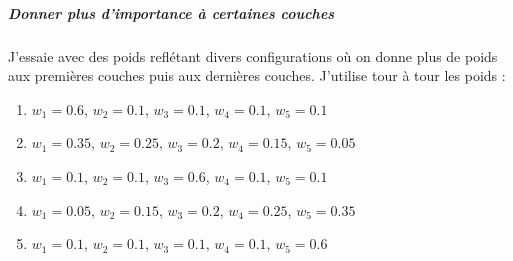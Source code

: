 \documentclass{article}
\begin{document}
\subparagraph*{Donner plus d'importance à certaines couches}
J'essaie avec des poids reflétant divers configurations où on donne plus de poids aux premières couches puis aux dernières couches.
J'utilise tour à tour les poids :
\begin{enumerate}
\item $w_1 = 0.6$, $w_2 = 0.1$, $w_3 = 0.1$, $w_4 = 0.1$, $w_5 = 0.1$
\item $w_1 = 0.35$, $w_2 = 0.25$, $w_3 = 0.2$, $w_4 = 0.15$, $w_5 = 0.05$
\item $w_1 = 0.1$, $w_2 = 0.1$, $w_3 = 0.6$, $w_4 = 0.1$, $w_5 = 0.1$
\item $w_1 = 0.05$, $w_2 = 0.15$, $w_3 = 0.2$, $w_4 = 0.25$, $w_5 = 0.35$
\item $w_1 = 0.1$, $w_2 = 0.1$, $w_3 = 0.1$, $w_4 = 0.1$, $w_5 = 0.6$
\end{enumerate}
\end{document}
